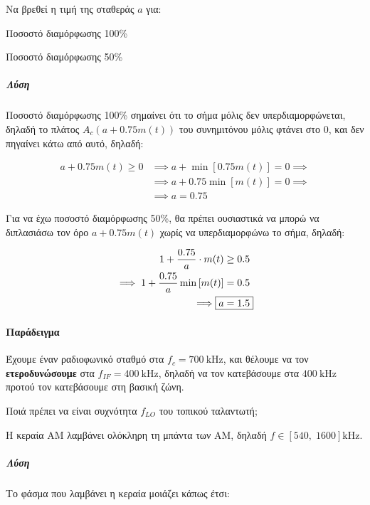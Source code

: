 \documentclass[11pt,a4paper,notitlepage,fleqn,final]{article}
\begin{document}
Να βρεθεί η τιμή της σταθεράς \( a \) για:
\begin{enumgreekparen}
	\item Ποσοστό διαμόρφωσης 100\%
	\item Ποσοστό διαμόρφωσης 50\%
\end{enumgreekparen}

\subparagraph{Λύση}
\begin{enumgreekparen}
	\item Ποσοστό διαμόρφωσης 100\% σημαίνει ότι το σήμα μόλις δεν υπερδιαμορφώνεται,
	δηλαδή το πλάτος \( A_c(a+0.75m(t)) \) του συνημιτόνου μόλις φτάνει στο 0, και δεν
	πηγαίνει κάτω από αυτό, δηλαδή:
	
	\begin{align*}
		a+0.75m(t) \geq 0 &\implies a+\min\left[0.75m(t)\right] = 0 \implies
		\\ &\implies a+0.75\min\left[m(t)\right] = 0 \implies \\& \implies
		\boxed{a=0.75}
	\end{align*}
	
	\item Για να έχω ποσοστό διαμόρφωσης 50\%, θα πρέπει ουσιαστικά να μπορώ να
	διπλασιάσω τον όρο \( a+0.75m(t) \) χωρίς να υπερδιαμορφώνω το σήμα, δηλαδή:
	
	\begin{align*}
		1+\frac{0.75}{a}\cdot m(t) &\geq 0.5 \\
		\implies 1+\frac{0.75}{a}\min\left[ m(t) \right] &= 0.5 \\
		\implies \Aboxed{a&=1.5}
	\end{align*}
\end{enumgreekparen}

\paragraph{Παράδειγμα}
Έχουμε έναν ραδιοφωνικό σταθμό στα \( f_c = \SI{700}{\kilo\hertz} \), και θέλουμε να
τον \textbf{ετεροδυνώσουμε} στα \( f_{IF} = \SI{400}{\kilo\hertz} \), δηλαδή να
τον κατεβάσουμε στα \( \SI{400}{\kilo\hertz} \) προτού τον κατεβάσουμε στη βασική ζώνη.

Ποιά πρέπει να είναι συχνότητα \( f_{LO} \) του τοπικού ταλαντωτή;

Η κεραία AM λαμβάνει ολόκληρη τη μπάντα των AM, δηλαδή \( f \in \left[540,\;1600\right]
\si{\kilo\hertz} \).

\subparagraph{Λύση}
Το φάσμα που λαμβάνει η κεραία μοιάζει κάπως έτσι:
\end{document}
